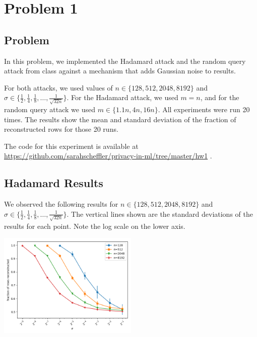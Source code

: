 %
%
%
\section{Problem 1}

\subsection{Problem}

In this problem, we implemented the Hadamard attack and the random query attack from class against a mechanism that
adds Gaussian noise to results.

For both attacks, we used values of $n \in \{128, 512, 2048, 8192\}$ and $\sigma \in \{\frac12, \frac14, \frac18,
\ldots, \frac{1}{\sqrt{32n}}\}$.  For the Hadamard attack, we used $m=n$, and for the random query attack we used $m
\in \{1.1n, 4n, 16n\}$.  All experiments were run 20 times.  The results show the mean and standard deviation of the
fraction of reconstructed rows for those 20 runs.

The code for this experiment is available at \href{https://github.com/sarahscheffler/privacy-in-ml/tree/master/hw1}{https://github.com/sarahscheffler/privacy-in-ml/tree/master/hw1} .

\subsection{Hadamard Results}

We observed the following results for $n \in \{128, 512, 2048, 8192\}$ and $\sigma \in \{\frac12, \frac14, \frac18,
\ldots, \frac{1}{\sqrt{32n}}\}$.  The vertical lines shown are the standard deviations of the results for each point.
Note the log scale on the lower axis.

\begin{center}
    \includegraphics[width=0.5\textwidth]{hadamard_graph.png}
\end{center}


